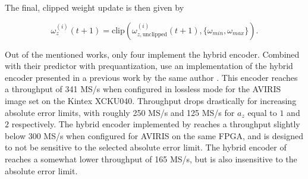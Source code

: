 The final, clipped weight update is then given by

\begin{equation}
	\omega^{(i)}_z(t + 1) = \text{clip} \left( \omega_{z, \text{unclipped}}^{(i)}(t+1), \{ \omega_{min}, \omega_{max} \} \right).
	\label{eq:clipped-delayed-weight-updates}
\end{equation}

Out of the mentioned works, only four implement the hybrid encoder. Combined with their predictor with prequantization, \citeauthor{chatziantoniouScalableDataRateNearLossless2022a} use an implementation of the hybrid encoder presented in a previous work by the same author \cite{chatziantoniouScalableDataRateNearLossless2022a, chatziantoniouHighPerformanceRTLImplementation2020}. This encoder reaches a throughput of 341 MS/s when configured in lossless mode for the AVIRIS image set on the Kintex XCKU040. Throughput drops drastically for increasing absolute error limits, with roughly 250 MS/s and 125 MS/s for $a_z$ equal to $1$ and $2$ respectively. The hybrid encoder implemented by \citeauthor{basconesRealTimeFPGAImplementation2022} reaches a throughput slightly below 300 MS/s when configured for AVIRIS on the same \acrshort{FPGA}, and is designed to not be sensitive to the selected absolute error limit. The hybrid encoder of \citeauthor{vorhaugHyperspectralImageCompression2024} reaches a somewhat lower throughput of 165 MS/s, but is also insensitive to the absolute error limit.


